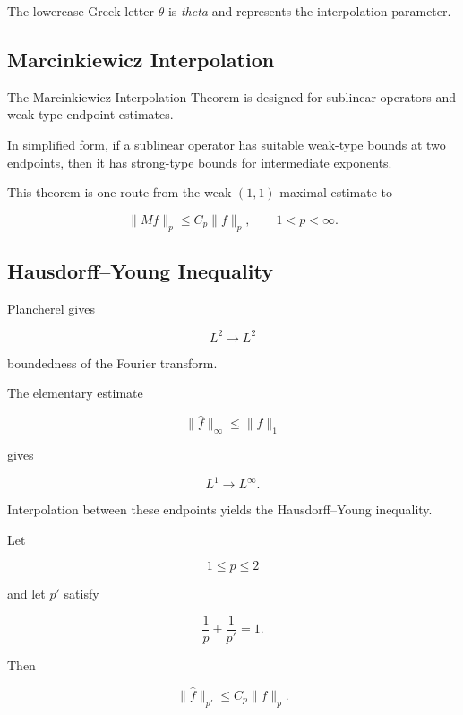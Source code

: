 The lowercase Greek letter \(\theta\) is \emph{theta} and represents the
interpolation parameter.

\subsection{Marcinkiewicz Interpolation}
\label{subsec:marcinkiewicz-interpolation}

The Marcinkiewicz Interpolation Theorem is designed for sublinear
operators and weak-type endpoint estimates.

In simplified form, if a sublinear operator has suitable weak-type
bounds at two endpoints, then it has strong-type bounds for intermediate
exponents.

This theorem is one route from the weak \((1,1)\) maximal estimate to

\[
\boxed{
\|Mf\|_p
\leq
C_p\|f\|_p,
\qquad
1<p<\infty.
}
\]

\subsection{Hausdorff--Young Inequality}
\label{subsec:hausdorff-young}

Plancherel gives

\[
L^2\to L^2
\]

boundedness of the Fourier transform.

The elementary estimate

\[
\boxed{
\|\widehat{f}\|_\infty
\leq
\|f\|_1
}
\]

gives

\[
L^1\to L^\infty.
\]

Interpolation between these endpoints yields the Hausdorff--Young
inequality.

\begin{theorem}
Let

\[
1\leq p\leq2
\]

and let \(p'\) satisfy

\[
\boxed{
\frac1p+\frac1{p'}=1.
}
\]

Then

\[
\boxed{
\|\widehat{f}\|_{p'}
\leq
C_p\|f\|_p.
}
\]
\end{theorem}


